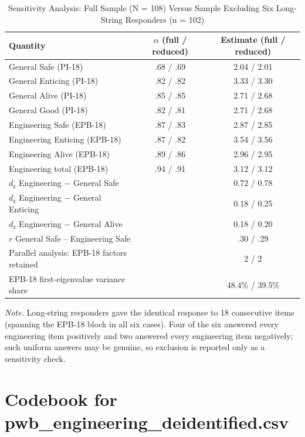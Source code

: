 \documentclass[journal,a4paper]{IEEEtran}
\begin{document}
\begin{table}[!htbp]
\centering
\renewcommand{\arraystretch}{1.15}
\footnotesize
\setlength{\tabcolsep}{6pt}
\caption{Sensitivity Analysis: Full Sample (N = 108) Versus Sample Excluding Six Long-String Responders (n = 102)}
\label{tab:s3}
\begin{tabular}{>{\raggedright\arraybackslash}p{7.5cm}cc}
\toprule
Quantity & $\alpha$ (full / reduced) & Estimate (full / reduced) \\
\midrule
General Safe (PI-18) & .68 / .69 & 2.04 / 2.01 \\
General Enticing (PI-18) & .82 / .82 & 3.33 / 3.30 \\
General Alive (PI-18) & .85 / .85 & 2.71 / 2.68 \\
General Good (PI-18) & .82 / .81 & 2.71 / 2.68 \\
Engineering Safe (EPB-18) & .87 / .83 & 2.87 / 2.85 \\
Engineering Enticing (EPB-18) & .87 / .82 & 3.54 / 3.56 \\
Engineering Alive (EPB-18) & .89 / .86 & 2.96 / 2.95 \\
Engineering total (EPB-18) & .94 / .91 & 3.12 / 3.12 \\
$d_{\mathrm{z}}$ Engineering $-$ General Safe &  & 0.72 / 0.78 \\
$d_{\mathrm{z}}$ Engineering $-$ General Enticing &  & 0.18 / 0.25 \\
$d_{\mathrm{z}}$ Engineering $-$ General Alive &  & 0.18 / 0.20 \\
$r$ General Safe – Engineering Safe &  & .30 / .29 \\
Parallel analysis: EPB-18 factors retained &  & 2 / 2 \\
EPB-18 first-eigenvalue variance share &  & 48.4\% / 39.5\% \\
\bottomrule
\end{tabular}

\vspace{3pt}\parbox{\textwidth}{\scriptsize \emph{Note.} Long-string responders gave the identical response to 18 consecutive items (spanning the EPB-18 block in all six cases). Four of the six answered every engineering item positively and two answered every engineering item negatively; such uniform answers may be genuine, so exclusion is reported only as a sensitivity check.}
\end{table}

\section{Codebook for pwb\_engineering\_deidentified.csv}\label{sec:s3}
\end{document}
